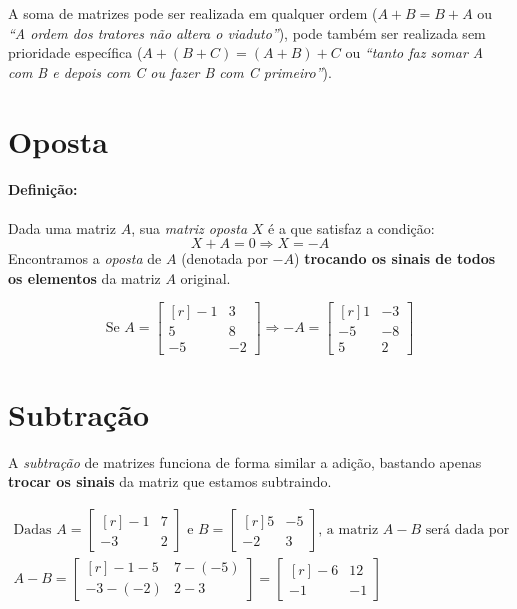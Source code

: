 A soma de matrizes pode ser realizada em qualquer ordem ($A+B=B+A$ ou \textit{“A ordem dos tratores não altera o viaduto”}), pode também ser realizada sem prioridade específica ($A+(B+C)=(A+B)+C$ ou \textit{“tanto faz somar A com B e depois com C ou fazer B com C primeiro”}).

\section{Oposta}

\paragraph{Definição:}

Dada uma matriz $A$, sua \textit{matriz oposta} $X$ é a que satisfaz a condição:
$$X+A=0\Rightarrow X=-A$$
Encontramos a \textit{oposta} de $A$ (denotada por $-A$) \textbf{trocando os sinais de todos os elementos} da matriz $A$ original.

\Example

$$
\text{Se }A=\begin{bmatrix*}[r]
-1 & 3\\
5 & 8\\
-5 & -2
\end{bmatrix*} \Rightarrow -A=\begin{bmatrix*}[r]
1 & -3 \\
-5 & -8\\
5 & 2
\end{bmatrix*}
$$

\section{Subtração}

A \textit{subtração} de matrizes funciona de forma similar a adição, bastando apenas \textbf{trocar os sinais} da matriz que estamos subtraindo.

\begin{gather*}
    \text{Dadas }A=\begin{bmatrix*}[r]
    -1 & 7 \\ -3 & 2
    \end{bmatrix*} \text{ e }B=\begin{bmatrix*}[r]
    5 & -5 \\ -2 & 3
    \end{bmatrix*} \text{, a matriz }A-B \text{ será dada por} \\
    A-B=\begin{bmatrix*}[r]
    -1-5 & 7-(-5) \\ -3-(-2) & 2-3
    \end{bmatrix*} = \begin{bmatrix*}[r]
    -6 & 12 \\ -1 & -1
    \end{bmatrix*}
\end{gather*}

